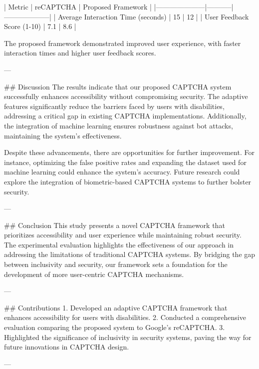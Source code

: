 | Metric              | reCAPTCHA | Proposed Framework |
|---------------------|-----------|--------------------|
| Average Interaction Time (seconds) | 15        | 12                 |
| User Feedback Score (1-10) | 7.1       | 8.6                |

The proposed framework demonstrated improved user experience, with faster interaction times and higher user feedback scores.

---

## Discussion
The results indicate that our proposed CAPTCHA system successfully enhances accessibility without compromising security. The adaptive features significantly reduce the barriers faced by users with disabilities, addressing a critical gap in existing CAPTCHA implementations. Additionally, the integration of machine learning ensures robustness against bot attacks, maintaining the system's effectiveness.

Despite these advancements, there are opportunities for further improvement. For instance, optimizing the false positive rates and expanding the dataset used for machine learning could enhance the system's accuracy. Future research could explore the integration of biometric-based CAPTCHA systems to further bolster security.

---

## Conclusion
This study presents a novel CAPTCHA framework that prioritizes accessibility and user experience while maintaining robust security. The experimental evaluation highlights the effectiveness of our approach in addressing the limitations of traditional CAPTCHA systems. By bridging the gap between inclusivity and security, our framework sets a foundation for the development of more user-centric CAPTCHA mechanisms.

---

## Contributions
1. Developed an adaptive CAPTCHA framework that enhances accessibility for users with disabilities.
2. Conducted a comprehensive evaluation comparing the proposed system to Google's reCAPTCHA.
3. Highlighted the significance of inclusivity in security systems, paving the way for future innovations in CAPTCHA design.

--- 

